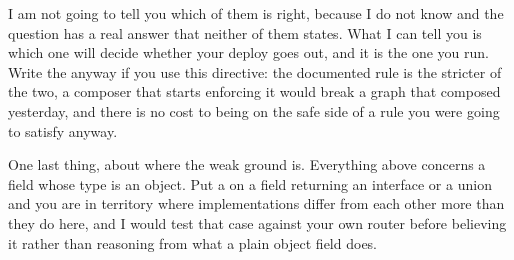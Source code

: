 %
I am not going to tell you which of them is right, because I do not know and
the question has a real answer that neither of them states. What I can tell you
is which one will decide whether your deploy goes out, and it is the one you
run. Write the  anyway if you use this directive: the
documented rule is the stricter of the two, a composer that starts enforcing it
would break a graph that composed yesterday, and there is no cost to being on
the safe side of a rule you were going to satisfy anyway.

%
One last thing, about where the weak ground is. Everything above concerns a
field whose type is an object. Put a  on a field returning an
interface or a union and you are in territory where implementations differ from
each other more than they do here, and I would test that case against your own
router before believing it rather than reasoning from what a plain object field
does.
%
